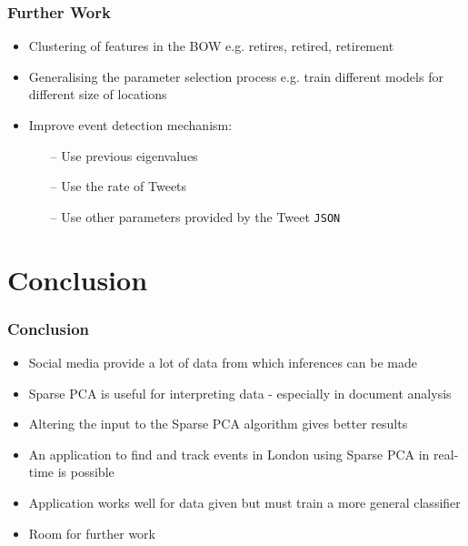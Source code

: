\documentclass{beamer}
\begin{document}
\begin{frame}
\frametitle{Further Work}
\begin{itemize}
\item Clustering of features in the BOW e.g. retires, retired, retirement
\item Generalising the parameter selection process e.g. train different models for different size of locations
\item Improve event detection mechanism:
	\begin{itemize}
	\item[--] Use previous eigenvalues
	\item[--] Use the rate of Tweets
	\item[--] Use other parameters provided by the Tweet \texttt{JSON}

	\end{itemize}

\end{itemize}
\end{frame}

\section{Conclusion}
\begin{frame}
\frametitle{Conclusion}
\begin{itemize}
\item Social media provide a lot of data from which inferences can be made
\item Sparse PCA is useful for interpreting data - especially in document analysis
\item Altering the input to the Sparse PCA algorithm gives better results
\item An application to find and track events in London using Sparse PCA in real-time is possible
\item Application works well for data given but must train a more general classifier
\item Room for further work

\end{itemize}
\end{frame}
\end{document}
